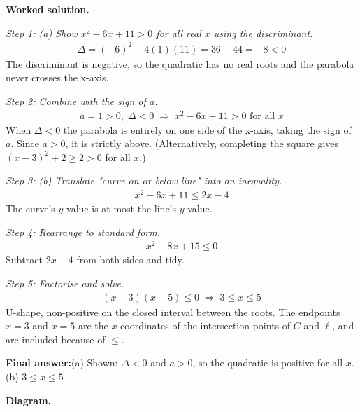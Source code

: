 \documentclass[11pt]{article}
\begin{document}
\textbf{Worked solution.}

\textit{Step 1: (a) Show \( x^2 - 6x + 11 > 0 \) for all real \( x \) using the discriminant.}
\[\begin{gathered}
\Delta = (-6)^2 - 4(1)(11) = 36 - 44 = -8 < 0
\end{gathered}\]
The discriminant is negative, so the quadratic has no real roots and the parabola never crosses the x-axis.

\textit{Step 2: Combine with the sign of \( a \).}
\[\begin{gathered}
a = 1 > 0, \; \Delta < 0 \;\Longrightarrow\; x^2 - 6x + 11 > 0 \text{ for all } x
\end{gathered}\]
When \( \Delta < 0 \) the parabola is entirely on one side of the x-axis, taking the sign of \( a \). Since \( a > 0 \), it is strictly above. (Alternatively, completing the square gives \( (x - 3)^2 + 2 \geq 2 > 0 \) for all \( x \).)

\textit{Step 3: (b) Translate "curve on or below line" into an inequality.}
\[\begin{gathered}
x^2 - 6x + 11 \leq 2x - 4
\end{gathered}\]
The curve's \( y \)-value is at most the line's \( y \)-value.

\textit{Step 4: Rearrange to standard form.}
\[\begin{gathered}
x^2 - 8x + 15 \leq 0
\end{gathered}\]
Subtract \( 2x - 4 \) from both sides and tidy.

\textit{Step 5: Factorise and solve.}
\[\begin{gathered}
(x - 3)(x - 5) \leq 0 \;\Longrightarrow\; 3 \leq x \leq 5
\end{gathered}\]
U-shape, non-positive on the closed interval between the roots. The endpoints \( x = 3 \) and \( x = 5 \) are the \( x \)-coordinates of the intersection points of \( C \) and \( \ell \), and are included because of \( \leq \).

\begin{answerbox}
\textbf{Final answer:}\quad (a) Shown: \(\displaystyle \Delta < 0\) and \(\displaystyle a > 0\), so the quadratic is positive for all \(\displaystyle x\). (b) \(\displaystyle 3 \leq x \leq 5\)
\end{answerbox}
\textbf{Diagram.}
\end{document}
